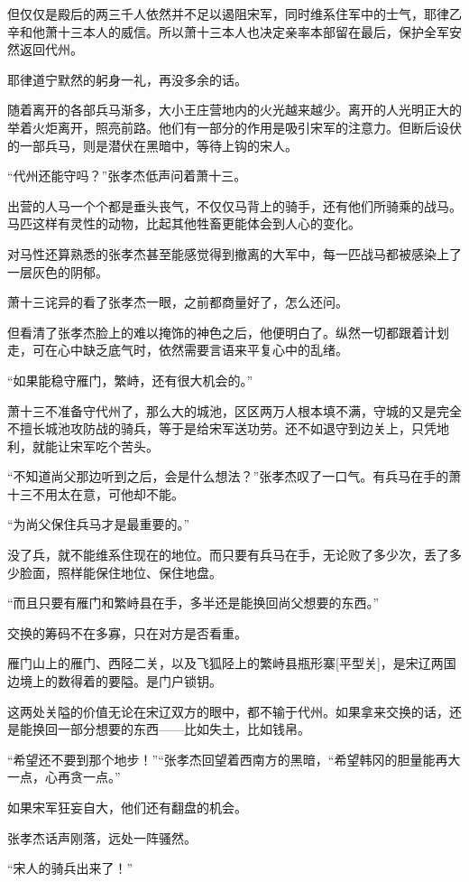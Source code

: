 但仅仅是殿后的两三千人依然并不足以遏阻宋军，同时维系住军中的士气，耶律乙辛和他萧十三本人的威信。所以萧十三本人也决定亲率本部留在最后，保护全军安然返回代州。

耶律道宁默然的躬身一礼，再没多余的话。

随着离开的各部兵马渐多，大小王庄营地内的火光越来越少。离开的人光明正大的举着火炬离开，照亮前路。他们有一部分的作用是吸引宋军的注意力。但断后设伏的一部兵马，则是潜伏在黑暗中，等待上钩的宋人。

“代州还能守吗？”张孝杰低声问着萧十三。

出营的人马一个个都是垂头丧气，不仅仅马背上的骑手，还有他们所骑乘的战马。马匹这样有灵性的动物，比起其他牲畜更能体会到人心的变化。

对马性还算熟悉的张孝杰甚至能感觉得到撤离的大军中，每一匹战马都被感染上了一层灰色的阴郁。

萧十三诧异的看了张孝杰一眼，之前都商量好了，怎么还问。

但看清了张孝杰脸上的难以掩饰的神色之后，他便明白了。纵然一切都跟着计划走，可在心中缺乏底气时，依然需要言语来平复心中的乱绪。

“如果能稳守雁门，繁峙，还有很大机会的。”

萧十三不准备守代州了，那么大的城池，区区两万人根本填不满，守城的又是完全不擅长城池攻防战的骑兵，等于是给宋军送功劳。还不如退守到边关上，只凭地利，就能让宋军吃个苦头。

“不知道尚父那边听到之后，会是什么想法？”张孝杰叹了一口气。有兵马在手的萧十三不用太在意，可他却不能。

“为尚父保住兵马才是最重要的。”

没了兵，就不能维系住现在的地位。而只要有兵马在手，无论败了多少次，丢了多少脸面，照样能保住地位、保住地盘。

“而且只要有雁门和繁峙县在手，多半还是能换回尚父想要的东西。”

交换的筹码不在多寡，只在对方是否看重。

雁门山上的雁门、西陉二关，以及飞狐陉上的繁峙县瓶形寨[平型关]，是宋辽两国边境上的数得着的要隘。是门户锁钥。

这两处关隘的价值无论在宋辽双方的眼中，都不输于代州。如果拿来交换的话，还是能换回一部分想要的东西——比如失土，比如钱帛。

“希望还不要到那个地步！”“张孝杰回望着西南方的黑暗，“希望韩冈的胆量能再大一点，心再贪一点。”

如果宋军狂妄自大，他们还有翻盘的机会。

张孝杰话声刚落，远处一阵骚然。

“宋人的骑兵出来了！”

